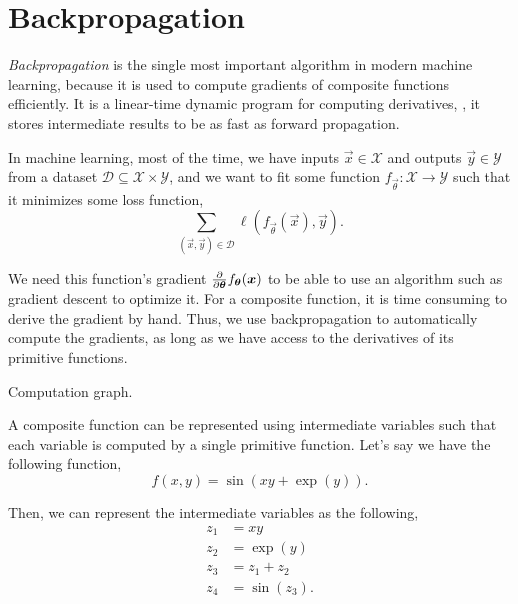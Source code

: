 \section{Backpropagation} \label{sec:backpropagation}

\textit{Backpropagation} is the single most important algorithm in modern
machine learning, because it is used to compute gradients of composite
functions efficiently. It is a linear-time dynamic program for computing
derivatives, \ie, it stores intermediate results to be as fast as forward
propagation.

In machine learning, most of the time, we have inputs $\vec{x}\in\mathcal{X}$
and outputs $\vec{y}\in\mathcal{Y}$ from a dataset
$\mathcal{D}\subseteq\mathcal{X}\times\mathcal{Y}$, and we want to fit some
function $f_{\vec{\theta}}: \mathcal{X} \to \mathcal{Y}$ such that it minimizes
some loss function, \[
  \sum_{(\vec{x},\vec{y})\in\mathcal{D}} \ell(f_{\vec{\theta}}(\vec{x}),\vec{y})
.\]

We need this function's gradient
$\pdv*{f_{\bm{\theta}}(\bm{x})}{\bm{\theta}}$ to be able to use an algorithm
such as gradient descent to optimize it. For a composite function, it is time
consuming to derive the gradient by hand. Thus, we use backpropagation to
automatically compute the gradients, as long as we have access to the
derivatives of its primitive functions.

\begin{example}
  \caption{Computation graph.}
  \label{ex:comp-graph}
  A composite function can be represented using intermediate variables such
  that each variable is computed by a single primitive function. Let's say we
  have the following function, \[
    f(x,y)=\sin(xy + \exp(y))
  .\]

  Then, we can represent the intermediate variables as the following,
  \begin{align*}
    z_1 &= xy \\
    z_2 &= \exp(y) \\
    z_3 &= z_1 + z_2 \\
    z_4 &= \sin(z_3)
  .\end{align*}

\end{example}

